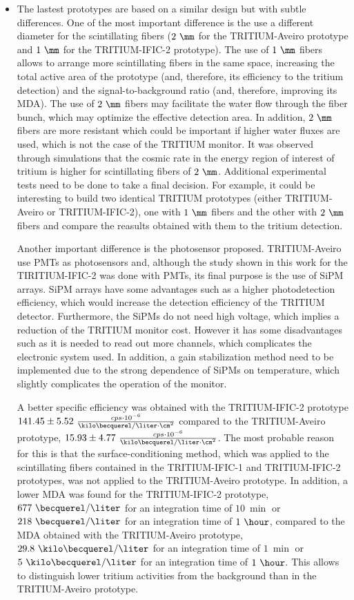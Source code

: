 \begin{enumerate}
\begin{itemize}
\item{} The lastest prototypes are based on a similar design but with subtle differences. One of the most important difference is the use a different diameter for the scintillating fibers ($2~\mm$ for the TRITIUM-Aveiro prototype and $1~\mm$ for the TRITIUM-IFIC-2 prototype). The use of $1~\mm$ fibers allows to arrange more scintillating fibers in the same space, increasing the total active area of the prototype (and, therefore, its efficiency to the tritium detection) and the signal-to-background ratio (and, therefore, improving its MDA). The use of $2~\mm$ fibers may facilitate the water flow through the fiber bunch, which may optimize the effective detection area. In addition, $2~\mm$ fibers are more resistant which could be important if higher water fluxes are used, which is not the case of the TRITIUM monitor. It was observed through simulations that the cosmic rate in the energy region of interest of tritium is higher for scintillating fibers of $2~\mm$. Additional experimental tests need to be done to take a final decision. For example, it could be interesting to build two identical TRITIUM prototypes (either TRITIUM-Aveiro or TRITIUM-IFIC-2), one with $1~\mm$ fibers and the other with $2~\mm$ fibers and compare the reasults obtained with them to the tritium detection.

Another important difference is the photosensor proposed. TRITIUM-Aveiro use PMTs as photosensors and, although the study shown in this work for the TIRITIUM-IFIC-2 was done with PMTs, its final purpose is the use of SiPM arrays. SiPM arrays have some advantages such as a higher photodetection efficiency, which would increase the detection efficiency of the TRITIUM detector. Furthermore, the SiPMs do not need high voltage, which implies a reduction of the TRITIUM monitor cost. However it has some disadvantages such as it is needed to read out more channels, which complicates the electronic system used. In addition, a gain stabilization method need to be implemented due to the strong dependence of SiPMs on temperature, which slightly complicates the operation of the monitor.

A better specific efficiency was obtained with the TRITIUM-IFIC-2 prototype $141.45 \pm 5.52~\frac{cps \cdot{} 10^{-6}}{\kilo\becquerel/ \liter \cdot{} \cm^2}$ compared to the TRITIUM-Aveiro prototype, $15.93\pm4.77~\frac{cps \cdot{} 10^{-6}}{\kilo\becquerel/ \liter \cdot{} \cm^2}$. The most probable reason for this is that the surface-conditioning method, which was applied to the scintillating fibers contained in the TRITIUM-IFIC-1 and TRITIUM-IFIC-2 prototypes, was not applied to the TRITIUM-Aveiro prototype. In addition, a lower MDA was found for the TRITIUM-IFIC-2 prototype, $677~\becquerel/\liter$ for an integration time of $10~\min$ or $218~\becquerel/\liter$ for an integration time of $1~\hour$, compared to the MDA obtained with the TRITIUM-Aveiro prototype, $29.8~\kilo\becquerel/\liter$ for an integration time of $1~\min$ or $5~\kilo\becquerel/\liter$ for an integration time of $1~\hour$. This allows to distinguish lower tritium activities from the background than in the TRITIUM-Aveiro prototype.


\end{itemize}
\end{enumerate}
